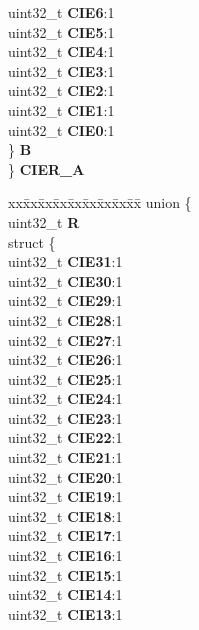 \begin{DoxyCompactItemize}
\begin{tabbing}
\>\>uint32\_t {\bfseries CIE6}:1\\
\>\>uint32\_t {\bfseries CIE5}:1\\
\>\>uint32\_t {\bfseries CIE4}:1\\
\>\>uint32\_t {\bfseries CIE3}:1\\
\>\>uint32\_t {\bfseries CIE2}:1\\
\>\>uint32\_t {\bfseries CIE1}:1\\
\>\>uint32\_t {\bfseries CIE0}:1\\
\>\} {\bfseries B}\\
\} {\bfseries CIER\_A}\\

\end{tabbing}\item 
\mbox{\label{structETPU__tag_a5a7e166ffae9e50d3316dd5fe19484f0}} 
\begin{tabbing}
xx\=xx\=xx\=xx\=xx\=xx\=xx\=xx\=xx\=\kill
union \{\\
\>uint32\_t {\bfseries R}\\
\>struct \{\\
\>\>uint32\_t {\bfseries CIE31}:1\\
\>\>uint32\_t {\bfseries CIE30}:1\\
\>\>uint32\_t {\bfseries CIE29}:1\\
\>\>uint32\_t {\bfseries CIE28}:1\\
\>\>uint32\_t {\bfseries CIE27}:1\\
\>\>uint32\_t {\bfseries CIE26}:1\\
\>\>uint32\_t {\bfseries CIE25}:1\\
\>\>uint32\_t {\bfseries CIE24}:1\\
\>\>uint32\_t {\bfseries CIE23}:1\\
\>\>uint32\_t {\bfseries CIE22}:1\\
\>\>uint32\_t {\bfseries CIE21}:1\\
\>\>uint32\_t {\bfseries CIE20}:1\\
\>\>uint32\_t {\bfseries CIE19}:1\\
\>\>uint32\_t {\bfseries CIE18}:1\\
\>\>uint32\_t {\bfseries CIE17}:1\\
\>\>uint32\_t {\bfseries CIE16}:1\\
\>\>uint32\_t {\bfseries CIE15}:1\\
\>\>uint32\_t {\bfseries CIE14}:1\\
\>\>uint32\_t {\bfseries CIE13}:1\\

\end{tabbing}
\end{DoxyCompactItemize}
